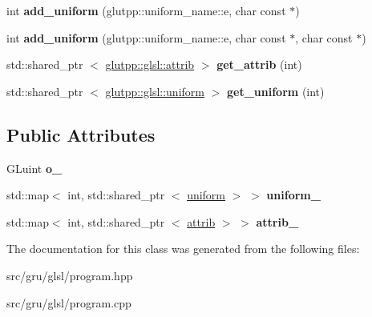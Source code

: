 \begin{DoxyCompactItemize}
\item 
\hypertarget{classglutpp_1_1glsl_1_1program_a03e5e8b1fa8d6e46c7b49ed1ba67ed66}{int {\bfseries add\-\_\-uniform} (glutpp\-::uniform\-\_\-name\-::e, char const $\ast$)}\label{classglutpp_1_1glsl_1_1program_a03e5e8b1fa8d6e46c7b49ed1ba67ed66}

\item 
\hypertarget{classglutpp_1_1glsl_1_1program_a332a3612070f74fc2974c0d214fb0293}{int {\bfseries add\-\_\-uniform} (glutpp\-::uniform\-\_\-name\-::e, char const $\ast$, char const $\ast$)}\label{classglutpp_1_1glsl_1_1program_a332a3612070f74fc2974c0d214fb0293}

\item 
\hypertarget{classglutpp_1_1glsl_1_1program_ab77d4536050a8ee71796b3e12fd73ef8}{std\-::shared\-\_\-ptr\*
$<$ \hyperlink{classglutpp_1_1glsl_1_1attrib}{glutpp\-::glsl\-::attrib} $>$ {\bfseries get\-\_\-attrib} (int)}\label{classglutpp_1_1glsl_1_1program_ab77d4536050a8ee71796b3e12fd73ef8}

\item 
\hypertarget{classglutpp_1_1glsl_1_1program_a9cd3338616ce3b17a8831b88b81ea024}{std\-::shared\-\_\-ptr\*
$<$ \hyperlink{classglutpp_1_1glsl_1_1uniform}{glutpp\-::glsl\-::uniform} $>$ {\bfseries get\-\_\-uniform} (int)}\label{classglutpp_1_1glsl_1_1program_a9cd3338616ce3b17a8831b88b81ea024}

\end{DoxyCompactItemize}
\subsection*{\-Public \-Attributes}
\begin{DoxyCompactItemize}
\item 
\hypertarget{classglutpp_1_1glsl_1_1program_ac72cb1de967afd0617edf350dfa80dfd}{\-G\-Luint {\bfseries o\-\_\-}}\label{classglutpp_1_1glsl_1_1program_ac72cb1de967afd0617edf350dfa80dfd}

\item 
\hypertarget{classglutpp_1_1glsl_1_1program_ab30a37c24b7567c10dbb49d2020f3527}{std\-::map$<$ int, std\-::shared\-\_\-ptr\*
$<$ \hyperlink{classglutpp_1_1glsl_1_1uniform}{uniform} $>$ $>$ {\bfseries uniform\-\_\-}}\label{classglutpp_1_1glsl_1_1program_ab30a37c24b7567c10dbb49d2020f3527}

\item 
\hypertarget{classglutpp_1_1glsl_1_1program_af8419390e2c2ba623c2a711568a7bdab}{std\-::map$<$ int, std\-::shared\-\_\-ptr\*
$<$ \hyperlink{classglutpp_1_1glsl_1_1attrib}{attrib} $>$ $>$ {\bfseries attrib\-\_\-}}\label{classglutpp_1_1glsl_1_1program_af8419390e2c2ba623c2a711568a7bdab}

\end{DoxyCompactItemize}


\-The documentation for this class was generated from the following files\-:\begin{DoxyCompactItemize}
\item 
src/gru/glsl/program.\-hpp\item 
src/gru/glsl/program.\-cpp\end{DoxyCompactItemize}
